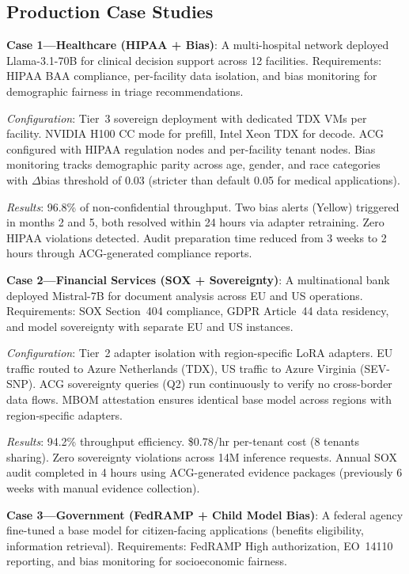 \documentclass[conference,10pt]{IEEEtran}
\begin{document}
\subsection{Production Case Studies}

\textbf{Case 1---Healthcare (HIPAA + Bias)}: A multi-hospital network deployed Llama-3.1-70B for clinical decision support across 12 facilities. Requirements: HIPAA BAA compliance, per-facility data isolation, and bias monitoring for demographic fairness in triage recommendations.

\emph{Configuration}: Tier~3 sovereign deployment with dedicated TDX VMs per facility. NVIDIA H100 CC mode for prefill, Intel Xeon TDX for decode. ACG configured with HIPAA regulation nodes and per-facility tenant nodes. Bias monitoring tracks demographic parity across age, gender, and race categories with $\Delta$bias threshold of 0.03 (stricter than default 0.05 for medical applications).

\emph{Results}: 96.8\% of non-confidential throughput. Two bias alerts (Yellow) triggered in months 2 and 5, both resolved within 24 hours via adapter retraining. Zero HIPAA violations detected. Audit preparation time reduced from 3 weeks to 2 hours through ACG-generated compliance reports.

\textbf{Case 2---Financial Services (SOX + Sovereignty)}: A multinational bank deployed Mistral-7B for document analysis across EU and US operations. Requirements: SOX Section~404 compliance, GDPR Article~44 data residency, and model sovereignty with separate EU and US instances.

\emph{Configuration}: Tier~2 adapter isolation with region-specific LoRA adapters. EU traffic routed to Azure Netherlands (TDX), US traffic to Azure Virginia (SEV-SNP). ACG sovereignty queries (Q2) run continuously to verify no cross-border data flows. MBOM attestation ensures identical base model across regions with region-specific adapters.

\emph{Results}: 94.2\% throughput efficiency. \$0.78/hr per-tenant cost (8 tenants sharing). Zero sovereignty violations across 14M inference requests. Annual SOX audit completed in 4 hours using ACG-generated evidence packages (previously 6 weeks with manual evidence collection).

\textbf{Case 3---Government (FedRAMP + Child Model Bias)}: A federal agency fine-tuned a base model for citizen-facing applications (benefits eligibility, information retrieval). Requirements: FedRAMP High authorization, EO~14110 reporting, and bias monitoring for socioeconomic fairness.
\end{document}
